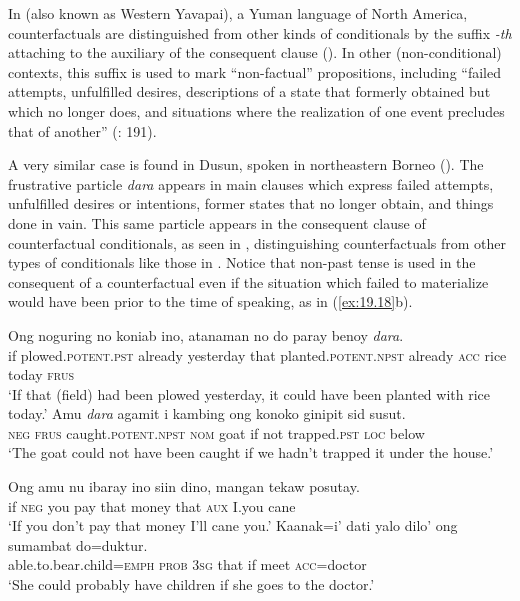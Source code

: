 In  (also known as Western Yavapai), a Yuman language of North America, counterfactuals are distinguished from other kinds of conditionals by the suffix \textit{-th} attaching to the auxiliary of the consequent clause (\citealt{HardyGordon1980}). In other (non-conditional) contexts, this suffix is used to mark “non-factual” propositions, including “failed attempts, unfulfilled desires, descriptions of a state that formerly obtained but which no longer does, and situations where the realization of one event precludes that of another” (\citealt{HardyGordon1980}: 191).



A very similar case is found in  Dusun, spoken in northeastern Borneo (\citealt{Kroeger2017}). The frustrative particle \textit{dara} appears in main clauses which express failed attempts, unfulfilled desires or intentions, former states that no longer obtain, and things done in vain. This same particle appears in the consequent clause of counterfactual conditionals, as seen in , distinguishing counterfactuals from other types of conditionals like those in . Notice that non-past tense is used in the consequent of a counterfactual even if the situation which failed to materialize would have been prior to the time of speaking, as in (\ref{ex:19.18}b).


\ea \label{ex:19.18}
\ea 
\gll  Ong  noguring  no  koniab  ino,  atanaman  no   do  paray  benoy  \textit{dara}.\\
if  plowed.\textsc{potent.pst}  already  yesterday  that  planted.\textsc{potent.npst}  already \textsc{acc}  rice  today  \textsc{frus}\\
\glt ‘If that (field) had been plowed yesterday, it could have been planted with rice today.’
\ex 
\gll  Amu  \textit{dara}  agamit  i  kambing  ong  konoko  ginipit  sid  susut.\\
\textsc{neg}  \textsc{frus}  caught.\textsc{potent.npst}  \textsc{nom}  goat  if  not  trapped\textsc{.pst}  \textsc{loc}  below\\
\glt ‘The goat could not have been caught if we hadn’t trapped it under the house.’
\z \z

\ea \label{ex:19.19}
\ea  \gll  Ong  amu  nu  ibaray  ino  siin  dino,  mangan  tekaw  posutay.\\
if  \textsc{neg}  you  pay  that  money  that  \textsc{aux}  I.you  cane\\
\glt ‘If you don’t pay that money I’ll cane you.’
\ex \gll  Kaanak=i’  dati  yalo  dilo’  ong  sumambat  do=duktur.\\
able.to.bear.child=\textsc{emph}  \textsc{prob}  \textsc{3sg}  that  if  meet  \textsc{acc}=doctor\\
\glt ‘She could probably have children if she goes to the doctor.’
\z \z


